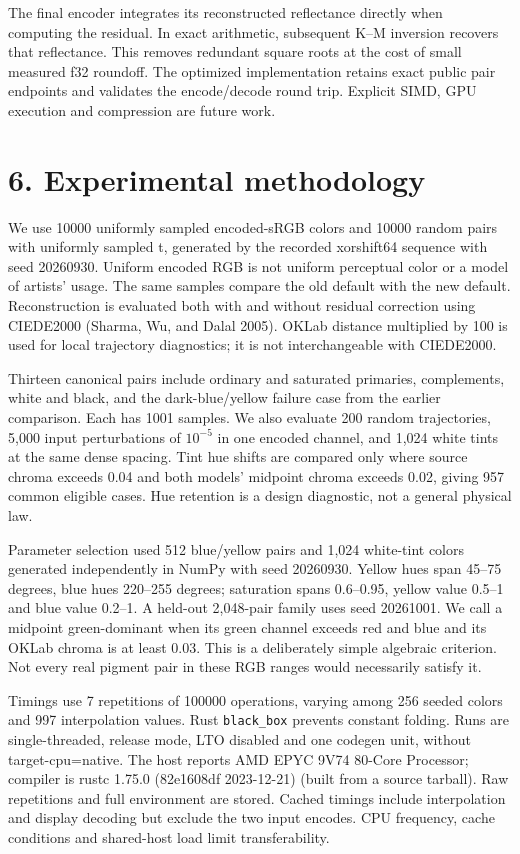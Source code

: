\documentclass[
  10pt,
  twocolumn]{article}
\begin{document}
The final encoder integrates its reconstructed reflectance directly when
computing the residual. In exact arithmetic, subsequent K--M inversion
recovers that reflectance. This removes redundant square roots at the
cost of small measured f32 roundoff. The optimized implementation
retains exact public pair endpoints and validates the encode/decode
round trip. Explicit SIMD, GPU execution and compression are future
work.

\hypertarget{experimental-methodology}{%
\section{6. Experimental methodology}\label{experimental-methodology}}

We use 10000 uniformly sampled encoded-sRGB colors and 10000 random
pairs with uniformly sampled t, generated by the recorded xorshift64
sequence with seed 20260930. Uniform encoded RGB is not uniform
perceptual color or a model of artists' usage. The same samples compare
the old default with the new default. Reconstruction is evaluated both
with and without residual correction using CIEDE2000 (Sharma, Wu, and
Dalal 2005). OKLab distance multiplied by 100 is used for local
trajectory diagnostics; it is not interchangeable with CIEDE2000.

Thirteen canonical pairs include ordinary and saturated primaries,
complements, white and black, and the dark-blue/yellow failure case from
the earlier comparison. Each has 1001 samples. We also evaluate 200
random trajectories, 5,000 input perturbations of \(10^{-5}\) in one
encoded channel, and 1,024 white tints at the same dense spacing. Tint
hue shifts are compared only where source chroma exceeds 0.04 and both
models' midpoint chroma exceeds 0.02, giving 957 common eligible cases.
Hue retention is a design diagnostic, not a general physical law.

Parameter selection used 512 blue/yellow pairs and 1,024 white-tint
colors generated independently in NumPy with seed 20260930. Yellow hues
span 45--75 degrees, blue hues 220--255 degrees; saturation spans
0.6--0.95, yellow value 0.5--1 and blue value 0.2--1. A held-out
2,048-pair family uses seed 20261001. We call a midpoint green-dominant
when its green channel exceeds red and blue and its OKLab chroma is at
least 0.03. This is a deliberately simple algebraic criterion. Not every
real pigment pair in these RGB ranges would necessarily satisfy it.

Timings use 7 repetitions of 100000 operations, varying among 256 seeded
colors and 997 interpolation values. Rust \texttt{black\_box} prevents
constant folding. Runs are single-threaded, release mode, LTO disabled
and one codegen unit, without target-cpu=native. The host reports AMD
EPYC 9V74 80-Core Processor; compiler is rustc 1.75.0 (82e1608df
2023-12-21) (built from a source tarball). Raw repetitions and full
environment are stored. Cached timings include interpolation and display
decoding but exclude the two input encodes. CPU frequency, cache
conditions and shared-host load limit transferability.
\end{document}
